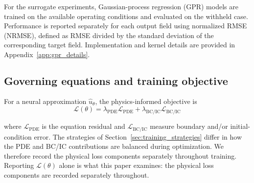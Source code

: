 \documentclass{article}
\begin{document}
For the surrogate experiments, Gaussian-process regression (GPR) models are
trained on the available operating conditions and evaluated on the withheld
case. Performance is reported separately for each output field using
normalized RMSE (NRMSE), defined as RMSE divided by the standard deviation
of the corresponding target field. Implementation and kernel details are
provided in Appendix~\ref{app:gpr_details}.




\subsection{Governing equations and training objective}
For a neural approximation $\hat{u}_{\theta}$, the physics-informed objective is
\begin{equation} \label{eq:objective}
    \mathcal{L}(\theta)
    = \lambda_{\mathrm{PDE}}\mathcal{L}_{\mathrm{PDE}}
    + \lambda_{\mathrm{BC/IC}}\mathcal{L}_{\mathrm{BC/IC}}
\end{equation}

where $\mathcal{L}_{\mathrm{PDE}}$ is the equation residual and $\mathcal{L}_{\mathrm{BC/IC}}$ measure boundary and/or initial-condition error. The strategies of Section~\ref{sec:training_strategies}  differ in how the PDE and BC/IC contributions are balanced during optimization. We therefore record the physical loss components separately throughout training. Reporting $\mathcal{L}(\theta)$ alone is what this paper examines: the physical loss components are recorded separately throughout.
\end{document}
